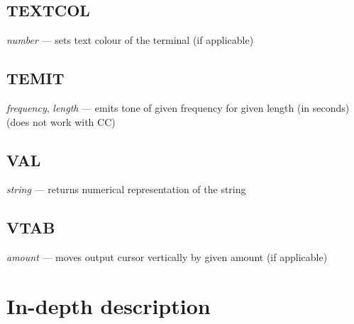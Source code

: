 \subsection{TEXTCOL} \emph{number} --- sets text colour of the terminal (if applicable)
\subsection{TEMIT} \emph{frequency}, \emph{length} --- emits tone of given frequency for given length (in seconds) (does not work with CC)
\subsection{VAL} \emph{string} --- returns numerical representation of the string
\subsection{VTAB} \emph{amount} --- moves output cursor vertically by given amount (if applicable)

\section{In-depth description}